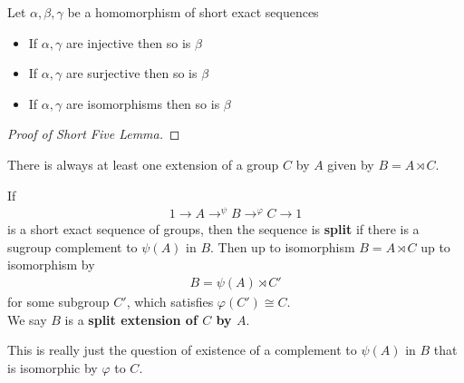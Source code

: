 \documentclass{memoir}
\begin{document}
\begin{prop}
	Let \(\alpha ,\beta ,\gamma \) be a homomorphism of short exact sequences
\begin{center}
\end{center}
\begin{itemize}
	\item If \(\alpha ,\gamma \) are injective then so is \(\beta \) 
	\item If \(\alpha ,\gamma \) are surjective then so is \(\beta \) 
	\item If \(\alpha ,\gamma \) are isomorphisms then so is \(\beta \)
\end{itemize}
\end{prop}

\begin{proof}[Proof of Short Five Lemma]
	
\end{proof}
There is always at least one extension of a group \(C\) by \(A\) given by \(B = A \rtimes C\).

\begin{defn}
	If
	\begin{align*}
		1 \to A \to^{\psi }B \to^{\varphi }C \to 1
	\end{align*}
	is a short exact sequence of groups, then the sequence is \textbf{split} if there is a sugroup complement to \(\psi (A)\) in \(B\). Then up to isomorphism \(B = A \rtimes C\) up to isomorphism by
	\begin{align*}
		B = \psi (A) \rtimes C'
	\end{align*}
	for some subgroup \(C'\), which satisfies \(\varphi (C') \cong C\).\\

	We say \(B\) is a \textbf{split extension of \(C\) by \(A\)}.
\end{defn}
This is really just the question of existence of a complement to \(\psi (A)\) in \(B\) that is isomorphic by \(\varphi \) to \(C\).
\end{document}
